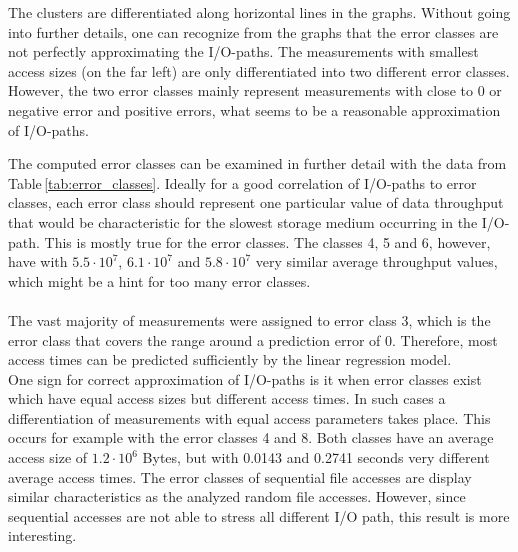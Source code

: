 \documentclass{superfri}
\begin{document}
The clusters are differentiated along horizontal lines in the graphs.
Without going into further details, one can recognize from the graphs that the error classes are not perfectly approximating the I/O-paths.
The measurements with smallest access sizes (on the far left) are only differentiated into two different error classes.
However, the two error classes mainly represent measurements with close to 0 or negative error and positive errors, what seems to be a reasonable approximation of I/O-paths.\medskip

The computed error classes can be examined in further detail with the data from Table\,\ref{tab:error_classes}.
Ideally for a good correlation of I/O-paths to error classes, each error class should represent one particular value of data throughput that would be characteristic for the slowest storage medium occurring in the I/O-path. 
This is mostly true for the error classes. The classes 4, 5 and 6, however, have with $5.5\cdot10^7$, $6.1\cdot10^7$ and $5.8\cdot10^7$ very similar average throughput values, which might be a hint for too many error classes.\\
\\
The vast majority of measurements were assigned to error class 3, which is the error class that covers the range around a prediction error of 0.
Therefore, most access times can be predicted sufficiently by the linear regression model.\\
One sign for correct approximation of I/O-paths is it when error classes exist which have equal access sizes but different access times.
In such cases a differentiation of measurements with equal access parameters takes place.
This occurs for example with the error classes 4 and 8. Both classes have an average access size of $1.2\cdot10^6$ Bytes, but with 0.0143 and 0.2741 seconds very different average access times.
The error classes of sequential file accesses are display similar characteristics as the analyzed random file accesses.
However, since sequential accesses are not able to stress all different I/O path, this result is more interesting.
\end{document}
